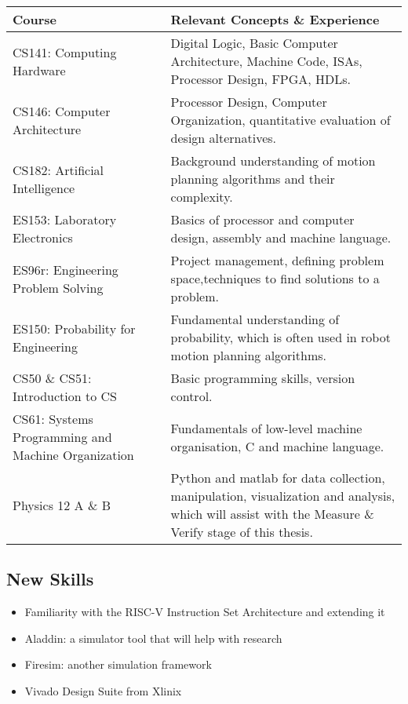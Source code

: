 \documentclass[11pt, oneside]{article}   	%
\begin{document}
\begin{center}
\begin{tabular}{ |m{0.4\linewidth}|m{0.6\linewidth}|}
    \hline
    \textbf{Course}                                     & \textbf{Relevant Concepts \& Experience} \\
    \hline
    CS141: Computing Hardware                           & Digital Logic, Basic Computer Architecture, Machine Code, ISAs, Processor Design, FPGA, HDLs. \\
    \hline
    CS146: Computer Architecture                        & Processor Design, Computer Organization, quantitative evaluation of design alternatives. \\
    \hline
    CS182: Artificial Intelligence                      & Background understanding of motion planning algorithms and their complexity. \\
    \hline
    ES153: Laboratory Electronics                       & Basics of processor and computer design, assembly and machine language. \\
    \hline
    ES96r: Engineering Problem Solving                  & Project management, defining problem space,techniques to find solutions to a problem. \\
    \hline
    ES150: Probability for Engineering                  & Fundamental understanding of probability, which is often used in robot motion planning algorithms. \\
    \hline
    CS50 \& CS51: Introduction to CS                    & Basic programming skills, version control. \\
    \hline
    CS61: Systems Programming and Machine Organization  & Fundamentals of low-level machine organisation, C and machine language. \\
    \hline
    Physics 12 A \& B                                   & Python and matlab for data collection, manipulation, visualization and analysis, which will assist with the Measure \& Verify stage of this thesis. \\
    \hline
\end{tabular}
\end{center}

\subsection{New Skills}

\begin{itemize}
    \item Familiarity with the RISC-V Instruction Set Architecture and extending it
    \item Aladdin: a simulator tool that will help with research
    \item Firesim: another simulation framework 
    \item Vivado Design Suite from Xlinix
\end{itemize}
\end{document}
